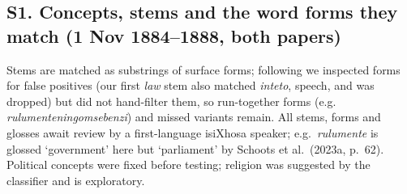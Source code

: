 \documentclass[10pt,letterpaper]{article}
\begin{document}
\subsection*{S1. Concepts, stems and the word forms they match (1 Nov 1884--1888, both papers)}
Stems are matched as substrings of surface forms; following \citet{schoots2023b} we inspected forms for false positives (our first \emph{law} stem also matched \emph{inteto}, speech, and was dropped) but did not hand-filter them, so run-together forms (e.g. \emph{rulumenteningomsebenzi}) and missed variants remain. All stems, forms and glosses await review by a first-language isiXhosa speaker; e.g.\ \emph{rulumente} is glossed `government' here but `parliament' by Schoots et al.\ (2023a, p.~62). Political concepts were fixed before testing; religion was suggested by the classifier and is exploratory.\\[2pt]
\end{document}
